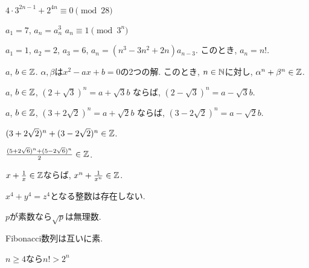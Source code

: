 \begin{prop}
  $4\cdot 3^{2n-1}+2^{4n}\equiv 0\pmod{28}$
\end{prop}

\begin{prop}
  $a_1=7$, $a_{n}=a_{n}^3$
  $a_n\equiv 1\pmod{3^n}$
\end{prop}

\begin{prop}
  $a_1=1$, $a_2=2$, $a_3=6$,
  $a_n=(n^3-3n^2+2n)a_{n-3}$.
  このとき, $a_n=n!$.
\end{prop}



\begin{prop}
  $a$, $b\in\mathbb{Z}$.
  $\alpha, \beta$は$x^2-ax+b=0$の2つの解.
  このとき, $n\in\mathbb{N}$に対し,
  $\alpha^n+\beta^n\in \mathbb{Z}$.
\end{prop}

\begin{prop}
  $a$, $b\in\mathbb{Z}$,  
  $(2+\sqrt{3})^n=a+\sqrt{3}b$
  ならば,
  $(2-\sqrt{3})^n=a-\sqrt{3}b$.
\end{prop}

\begin{prop}
  $a$, $b\in\mathbb{Z}$,  
  $(3+2\sqrt{2})^n=a+\sqrt{2}b$
  ならば,
  $(3-2\sqrt{2})^n=a-\sqrt{2}b$.
\end{prop}


\begin{prop}
  $(3+2\sqrt{2})^n+(3-2\sqrt{2})^n\in\mathbb{Z}$.
\end{prop}

\begin{prop}
  $\frac{(5+2\sqrt{6})^n+(5-2\sqrt{6})^n}{2}\in\mathbb{Z}$.
\end{prop}

\begin{prop}
  $x+\frac{1}{x}\in\mathbb{Z}$ならば, 
  $x^n+\frac{1}{x^n}\in\mathbb{Z}$.
\end{prop}


\begin{prop}
  $x^4+y^4=z^4$となる整数は存在しない.
\end{prop}

\begin{prop}
  $p$が素数なら$\sqrt{p}$は無理数.
\end{prop}

\begin{prop}
  Fibonacci数列は互いに素.
\end{prop}



\begin{prop}
  $n\geq 4$なら$n!>2^n$
\end{prop}



